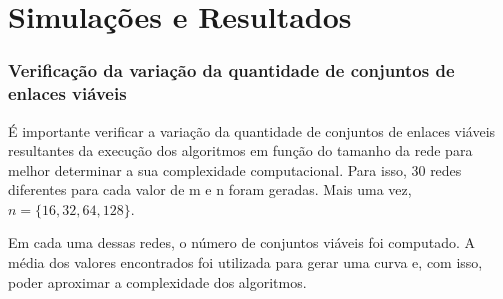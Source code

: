 \section{Simulações e Resultados}

\subsubsection{Verificação da variação da quantidade de conjuntos de enlaces viáveis}

É importante verificar a variação da quantidade de conjuntos de enlaces viáveis resultantes da execução dos algoritmos em função do tamanho da rede para melhor determinar a sua complexidade computacional. Para isso, 30 redes diferentes para cada valor de m e n foram geradas. Mais uma vez, $n=\{16,32,64,128\}$. 

Em cada uma dessas redes, o número de conjuntos viáveis foi computado. A média dos valores encontrados foi utilizada para gerar uma curva e, com isso, poder aproximar a complexidade dos algoritmos.

